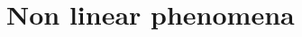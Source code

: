 \documentclass[11pt, a4paper, oneside]{article}
\begin{document}
\section{Non linear phenomena}
\label{sec:1}
%
%
%
%
%
%
%
%




%
%
%


%
\end{document}

